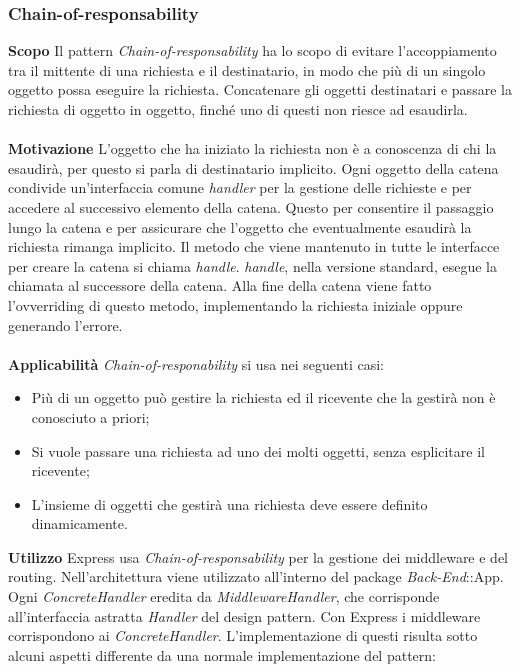 \subsubsection{Chain-of-responsability}
\textbf{Scopo}	Il pattern \textit{Chain-of-responsability} ha lo scopo di evitare l'accoppiamento tra il mittente di una richiesta e il destinatario, in modo che più di un singolo oggetto possa eseguire la richiesta. Concatenare gli oggetti destinatari e passare la richiesta di oggetto in oggetto, finché uno di questi non riesce ad esaudirla.
\\\\
\textbf{Motivazione}	L'oggetto che ha iniziato la richiesta non è a conoscenza di chi la esaudirà, per questo si parla di destinatario implicito. Ogni oggetto della catena condivide un'interfaccia comune \textit{handler} per la gestione delle richieste e per accedere al successivo elemento della catena. Questo per consentire il passaggio lungo la catena e per assicurare che l'oggetto che eventualmente esaudirà la richiesta rimanga implicito. Il metodo che viene mantenuto in tutte le interfacce per creare la catena si chiama \textit{handle}. \textit{handle}, nella versione standard, esegue la chiamata al successore della catena. Alla fine della catena viene fatto l'ovverriding di questo metodo, implementando la richiesta iniziale oppure generando l'errore.
\\\\
\textbf{Applicabilità}	\textit{Chain-of-responability} si usa nei seguenti casi:
	\begin{itemize}
		\item Più di un oggetto può gestire la richiesta ed il ricevente che la gestirà non è conosciuto a priori;
		\item Si vuole passare una richiesta ad uno dei molti oggetti, senza esplicitare il ricevente;
		\item L'insieme di oggetti che gestirà una richiesta deve essere definito dinamicamente.
	\end{itemize}
\textbf{Utilizzo}	Express usa \textit{Chain-of-responsability} per la gestione dei middleware e del routing. Nell'architettura viene utilizzato all'interno del package \textit{Back-End}::App. Ogni \textit{ConcreteHandler} eredita da \textit{MiddlewareHandler}, che corrisponde all'interfaccia astratta \textit{Handler} del design pattern. Con Express i middleware corrispondono ai \textit{ConcreteHandler}. L'implementazione di questi risulta sotto alcuni aspetti differente da una normale implementazione del pattern:
